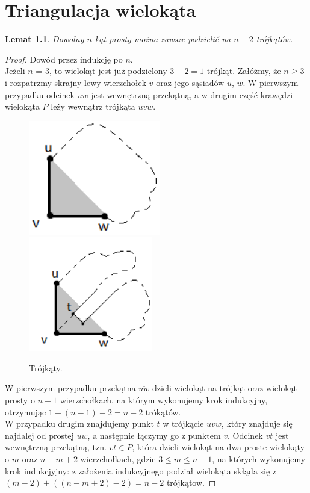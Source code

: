 \documentclass[brudnopis]{xmgr}
\newtheorem{Lemat}{Lemat}
\theoremstyle{definition}
\begin{document}
\chapter{Triangulacja wielokąta}\label{triangulacja}
\begin{Lemat}\label{podzial na trojkaty}
Dowolny $n$-kąt prosty można zawsze podzielić na $n-2$ trójkątów.
\end{Lemat}
\begin{proof}
	Dowód przez indukcję po $n$.
	\\Jeżeli $n$ = 3, to wielokąt jest już podzielony $3 - 2 = 1$ trójkąt.
	Załóżmy, że $n \ge 3$ i rozpatrzmy skrajny lewy wierzchołek $v$ oraz jego sąsiadów $u$, $w$.
	W pierwszym przypadku odcinek $uw$ jest wewnętrzną przekątną, a w drugim część krawędzi wielokąta $P$ leży wewnątrz trójkąta $uvw$.

  \begin{figure}[ht!]
    \centering
    \includegraphics[height=5cm]{rysunki/triangulacja_1.png}
    \includegraphics[height=5cm]{rysunki/triangulacja_2.png}
    \caption{Trójkąty.}
  \end{figure} 
	
	\indent W pierwszym przypadku przekątna $\overline{u w}$ dzieli wielokąt na trójkąt oraz wielokąt prosty o $n - 1$ wierzchołkach, na którym wykonujemy krok indukcyjny, otrzymując $1 + (n - 1) -2 = n - 2$ trókątów.
	\\\indent W przypadku drugim znajdujemy punkt $t$ w trójkącie $uvw$, który znajduje się najdalej od prostej $uw$, a następnie łączymy go z punktem $v$. Odcinek $\overline{v t}$ jest wewnętrzną przekątną, tzn. $\overline{vt} \in P$, która dzieli wielokąt na dwa proste wielokąty o $m$ oraz $n - m + 2$ wierzchołkach, gdzie $3 \le m \le n-1$, na których wykonujemy krok indukcjyjny: z założenia indukcyjnego podział wielokąta skłąda się z $(m - 2) + ((n - m + 2) -2) = n - 2$ trójkątow.
\end{proof}
\end{document}
